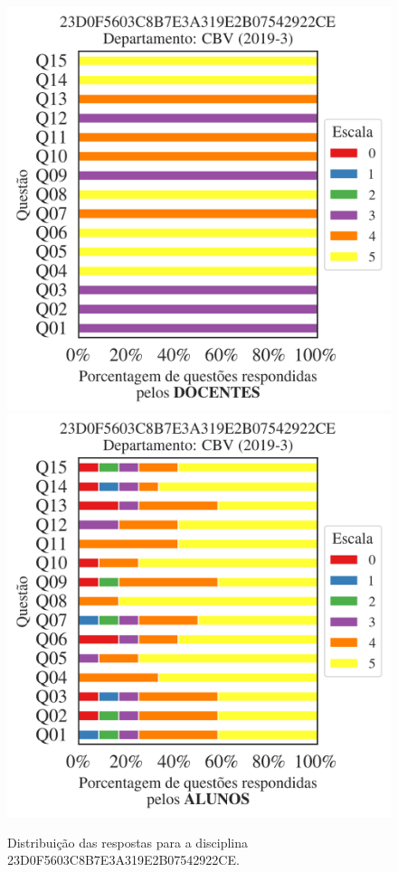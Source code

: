 \documentclass[a4paper,10pt]{article}
\begin{document}
\begin{figure}[h]
\centering
\includegraphics[width=0.485\linewidth]{analise_disciplina_departamento_CBV_23D0F5603C8B7E3A319E2B07542922CE_docentes.png}
\includegraphics[width=0.485\linewidth]{analise_disciplina_departamento_CBV_23D0F5603C8B7E3A319E2B07542922CE_alunos.png}
\caption{\label{fig:analise_geral_departamento}                Distribuição das respostas para a disciplina 23D0F5603C8B7E3A319E2B07542922CE. }
\end{figure}
\end{document}
